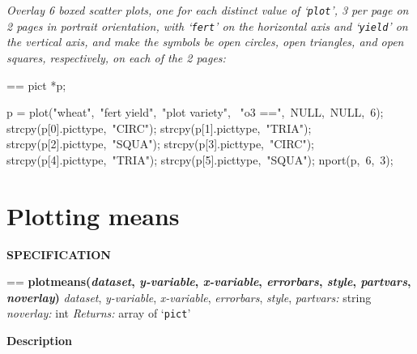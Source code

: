 \documentclass{book}
\makeatletter
\newcommand\Texinfocommandstyletextvar[1]{{\normalfont{}\textsl{#1}}}%
\newenvironment{Texinfopreformatted}{%
  \par\GNUTobeylines\obeyspaces\frenchspacing\parskip=\z@\parindent=\z@}{}
{\catcode`\^^M=13 \gdef\GNUTobeylines{\catcode`\^^M=13 \def^^M{\null\par}}}
\newenvironment{Texinfoindented}{\begin{list}{}{}\item\relax}{\end{list}}
\renewcommand{\_}{\Texinfounderscore\discretionary{}{}{}}
\makeatother
\begin{document}
\emph{Overlay 6 boxed scatter plots, one for each distinct value
of `\texttt{plot}', 3 per page on 2 pages in portrait orientation,
with `\texttt{fert}' on the horizontal
axis and `\texttt{yield}' on the vertical axis, and make the symbols
be open circles, open triangles, and open squares,
respectively, on each of the 2 pages:}
\begin{Texinfoindented}
\begin{Texinfopreformatted}%
\ttfamily pict *p;

p = plot("wheat",\ "fert yield",\ "plot variety",
\                                     "o3 ==",\ NULL,\ NULL,\ 6);
strcpy(p[0].pict\_type,\ "CIRC");
strcpy(p[1].pict\_type,\ "TRIA");
strcpy(p[2].pict\_type,\ "SQUA");
strcpy(p[3].pict\_type,\ "CIRC");
strcpy(p[4].pict\_type,\ "TRIA");
strcpy(p[5].pict\_type,\ "SQUA");
nport(p,\ 6,\ 3);
\end{Texinfopreformatted}
\end{Texinfoindented}

\section{{Plotting means}}
\label{anchor:Plotting-means}%
%
%
%
%
%

\noindent{}\textbf{SPECIFICATION}
\begin{Texinfoindented}
\begin{Texinfopreformatted}%
\textbf{plotmeans(\Texinfocommandstyletextvar{dataset}, \Texinfocommandstyletextvar{y-variable}, \Texinfocommandstyletextvar{x-variable}, \Texinfocommandstyletextvar{errorbars}, \Texinfocommandstyletextvar{style}, \Texinfocommandstyletextvar{partvars}, \Texinfocommandstyletextvar{noverlay})}
\Texinfocommandstyletextvar{dataset}, \Texinfocommandstyletextvar{y-variable}, \Texinfocommandstyletextvar{x-variable}, \Texinfocommandstyletextvar{errorbars}, \Texinfocommandstyletextvar{style}, \Texinfocommandstyletextvar{partvars:} string
\Texinfocommandstyletextvar{noverlay:} int
\Texinfocommandstyletextvar{Returns:} array of `\texttt{pict}'
\end{Texinfopreformatted}
\end{Texinfoindented}
%
%
%

\noindent{}\textbf{Description}
\end{document}
